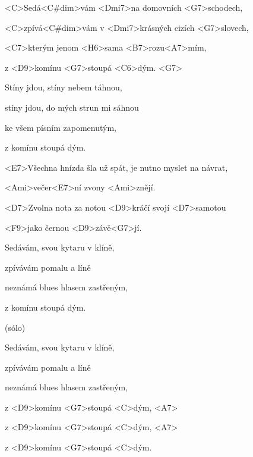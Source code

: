 

\zs
<C>Sedá<C#dim>vám <Dmi7>na domovních <G7>schodech,

<C>zpívá<C#dim>vám v <Dmi7>krásných cizích <G7>slovech, 

<C7>kterým jenom <H6>sama <B7>rozu<A7>mím,

z <D9>komínu <G7>stoupá <C6>dým. <G7>
\ks

\zs
Stíny jdou, stíny nebem táhnou,

stíny jdou, do mých strun mi sáhnou

ke všem písním zapomenutým,

z komínu stoupá dým.
\ks

\zr
<E7>Všechna hnízda šla už spát, je nutno myslet na návrat,

<Ami>večer<E7>ní zvony <Ami>znějí.

<D7>Zvolna nota za notou <D9>kráčí svojí <D7>samotou

<F9>jako černou <D9>závě<G7>jí.
\kr

\zs
Sedávám, svou kytaru v klíně,

zpívávám pomalu a líně

neznámá blues hlasem zastřeným,

z komínu stoupá dým.
\ks

\zs
(sólo)
\ks

\zr
\kr

\zs
Sedávám, svou kytaru v klíně,

zpívávám pomalu a líně

neznámá blues hlasem zastřeným,

z <D9>komínu <G7>stoupá <C>dým, <A7>
 
z <D9>komínu <G7>stoupá <C>dým, <A7>
 
z <D9>komínu <G7>stoupá <C>dým.
\ks

\kp
